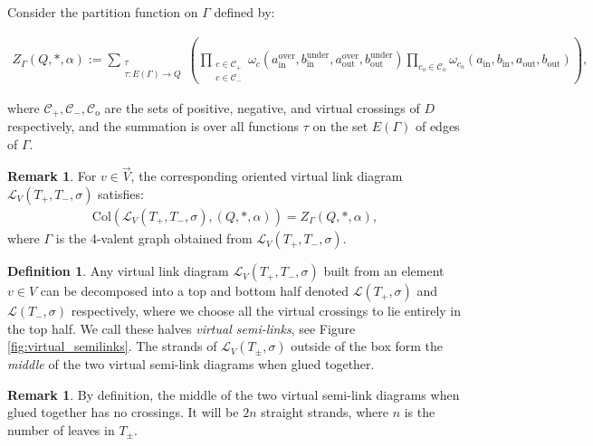 \documentclass[11pt, twoside]{amsart}
\numberwithin{equation}{section}
\theoremstyle{definition}
\newtheorem{definition}[theorem]{Definition}
\newtheorem{remark}[theorem]{Remark}
\numberwithin{equation}{section}
\begin{document}
Consider the partition function on $\Gamma$ defined by:

\begin{align*}
    Z_\Gamma(Q,*,\alpha):= \sum_{\substack{\tau\\\tau: E(\Gamma)\to Q}}\left(\prod_{\substack{c \in \mathcal{C}_+\\ c\in \mathcal{C}_-} }\omega_{c} (a_{\text{in}}^\text{over}, b_{\text{in}}^\text{under}, a_{\text{out}}^\text{over},b_{\text{out}}^\text{under})\prod_{c_\text{o}\in \mathcal{C}_\text{o}}\omega_{c_\text{o}}(a_\text{in}, b_\text{in}, a_\text{out}, b_\text{out})\right),
\end{align*}

\noindent where $\mathcal{C}_+,\mathcal{C}_-,\mathcal{C}_\text{o}$ are the sets of positive, negative, and virtual crossings of $D$ respectively, and the summation is over all functions $\tau$ on the set $E(\Gamma)$ of edges of $\Gamma$. 

\begin{remark}\label{rem: opq_colorings_is_Z}
    For $v \in \vec{V}$, the corresponding oriented virtual link diagram $\mathscr{L}_V(T_+,T_-,\sigma)$ satisfies: 
    \begin{align*}
        \text{Col}(\mathscr{L}_{V}(T_+,T_-,\sigma),(Q,*,\alpha))=Z_\Gamma(Q,*,\alpha),
    \end{align*}
    where $\Gamma$ is the 4-valent graph obtained from $\mathscr{L}_{V}(T_+,T_-,\sigma)$. 
\end{remark}

\begin{definition}
    Any virtual link diagram $\mathscr{L}_{V}(T_+, T_-,\sigma)$ built from an element $v \in V$ can be decomposed into a top and bottom half denoted $\mathscr{L}(T_+,\sigma)$ and $\mathscr{L}(T_-, \sigma)$ respectively, where we choose all the virtual crossings to lie entirely in the top half. We call these halves \textit{virtual semi-links}, see Figure \ref{fig:virtual_semilinks}. The strands of $\mathscr{L}_{V}(T_\pm,\sigma)$ outside of the box form the \textit{middle} of the two virtual semi-link diagrams when glued together.
\end{definition}

\begin{remark}
    By definition, the middle of the two virtual semi-link diagrams when glued together has no crossings. It will be $2n$ straight strands, where $n$ is the number of leaves in $T_{\pm}$.
\end{remark}
\end{document}
